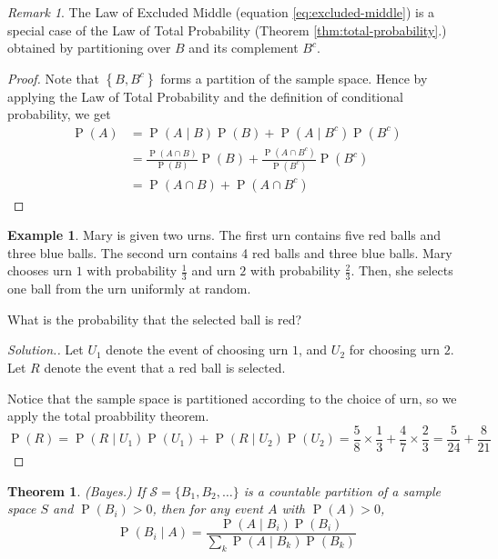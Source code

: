 \documentclass[11pt]{article}
\makeatletter
\newtheorem{thm}{Theorem}
\theoremstyle{definition}
\newtheorem{eg}{Example}
\theoremstyle{remark}
\newtheorem{rem}{Remark}[section]
\newenvironment{solution}{
    \let\oldqedsymbol=\qedsymbol%
    \def\@addpunct##1{}%
    \renewcommand{\qedsymbol}{$\blacktriangleleft$}%
    \begin{proof}[\textit Solution.]
}{
    \end{proof}%
    \renewcommand{\qedsymbol}{\oldqedsymbol}
}
\newcommand{\parens}[1]{\left(#1\right)}
\newcommand{\setof}[1]{\left\{#1\right\}}
\newcommand{\intersn}{\cap}
\newcommand{\given}{\;\vert\;}
\DeclareMathOperator{\Prob}{P}
\renewcommand{\P}[1]{\Prob{\parens{#1}}}
\makeatother
\begin{document}
\begin{rem}
    The Law of Excluded Middle (equation \ref{eq:excluded-middle}) is a special
    case of the Law of Total Probability (Theorem \ref{thm:total-probability}.)
    obtained by partitioning over $B$ and its complement $B^c$.
\end{rem}

\begin{proof}
    Note that $\setof{B, B^c}$ forms a partition of the sample space. Hence by
    applying the Law of Total Probability and the definition of conditional
    probability, we get
    \begin{align*}
        \P{A}
        &= \P{A \given B} \P{B} + \P{A \given B^c} \P{B^c} \\
        &= \frac{\P{A \intersn B}}{\P{B}} \P{B}
            + \frac{\P{A \intersn B^c}}{\P{B^c}} \P{B^c} \\
        &= \P{A \intersn B} + \P{A \intersn B^c}
    \end{align*}
\end{proof}

\begin{eg}
    \label{eg:marys-urns}
    Mary is given two urns. The first urn contains five red balls and three
    blue balls. The second urn contains 4 red balls and three blue balls. Mary
    chooses urn $1$ with probability $\frac{1}{3}$ and urn $2$ with probability
    $\frac{2}{3}$. Then, she selects one ball from the urn uniformly at random.

    What is the probability that the selected ball is red?
\end{eg}

\begin{solution}
    Let $U_1$ denote the event of choosing urn $1$, and $U_2$ for choosing urn
    $2$. Let $R$ denote the event that a red ball is selected.

    Notice that the sample space is partitioned according to the choice of urn,
    so we apply the total proabbility theorem.
    \begin{equation*}
        \P{R}
        = \P{R \given U_1}\P{U_1} + \P{R \given U_2}\P{U_2}
        = \frac{5}{8} \times \frac{1}{3} + \frac{4}{7} \times \frac{2}{3}
        = \frac{5}{24} + \frac{8}{21}
    \end{equation*}
\end{solution}

\begin{thm}{(Bayes.)}
    \label{thm:bayes}
    If $\mathcal{S} = \{B_1, B_2, \ldots\}$ is a countable partition of a
    sample space $S$ and $\P{B_i} > 0$, then for any event $A$ with
    $\P{A} > 0$,
    \begin{equation}
        \label{eq:bayes}
        \P{B_i \given A}
        = \frac{\P{A \given B_i}\P{B_i}}{\sum_{k} \P{A \given B_k} \P{B_k}}
    \end{equation}
\end{thm}
\end{document}
